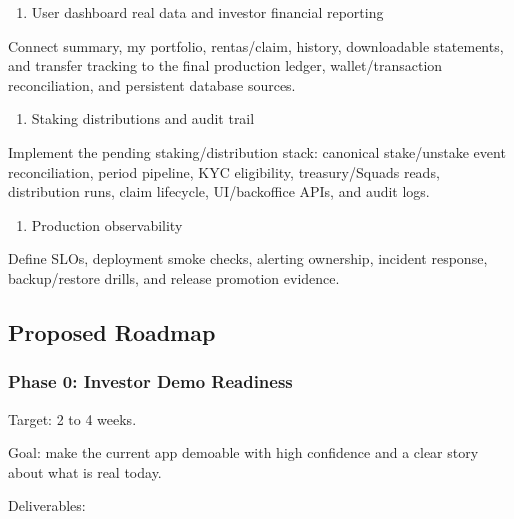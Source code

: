 \documentclass[
  10pt,
  letterpaper,
]{article}
\providecommand{\tightlist}{%
  \setlength{\itemsep}{0pt}\setlength{\parskip}{0pt}}
\begin{document}
\begin{enumerate}
\def\labelenumi{\arabic{enumi}.}
\setcounter{enumi}{7}
\tightlist
\item
  User dashboard real data and investor financial reporting
\end{enumerate}

Connect summary, my portfolio, rentas/claim, history, downloadable
statements, and transfer tracking to the final production ledger,
wallet/transaction reconciliation, and persistent database sources.

\begin{enumerate}
\def\labelenumi{\arabic{enumi}.}
\setcounter{enumi}{8}
\tightlist
\item
  Staking distributions and audit trail
\end{enumerate}

Implement the pending staking/distribution stack: canonical
stake/unstake event reconciliation, period pipeline, KYC eligibility,
treasury/Squads reads, distribution runs, claim lifecycle, UI/backoffice
APIs, and audit logs.

\begin{enumerate}
\def\labelenumi{\arabic{enumi}.}
\setcounter{enumi}{9}
\tightlist
\item
  Production observability
\end{enumerate}

Define SLOs, deployment smoke checks, alerting ownership, incident
response, backup/restore drills, and release promotion evidence.

\subsection{Proposed Roadmap}\label{proposed-roadmap}

\subsubsection{Phase 0: Investor Demo
Readiness}\label{phase-0-investor-demo-readiness}

Target: 2 to 4 weeks.

Goal: make the current app demoable with high confidence and a clear
story about what is real today.

Deliverables:
\end{document}
